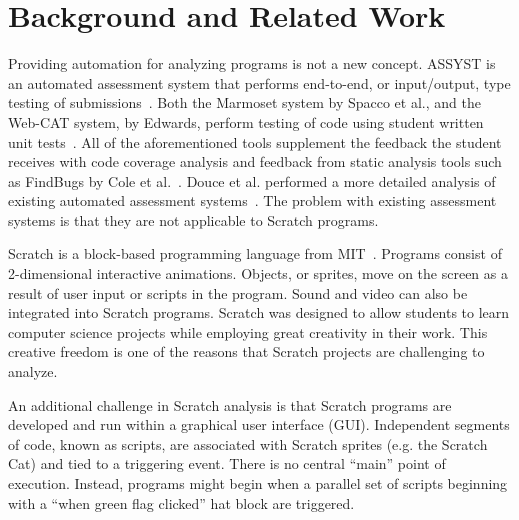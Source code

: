 \section{Background and Related Work}

Providing automation for analyzing programs is not a new concept.  ASSYST is an
automated assessment system that performs end-to-end, or input/output, type
testing of submissions~\cite{Jackson:1997:GSP:268084.268210}. Both the Marmoset
system by Spacco et al., and the Web-CAT system, by Edwards, perform testing of
code using student written unit tests~\cite{Spacco:2006:EMD:1140124.1140131,
  Edwards:2003:RCS:949344.949390}. All of the aforementioned tools supplement
the feedback the student receives with code coverage analysis and feedback from
static analysis tools such as FindBugs by Cole et
al.~\cite{Cole:2006:IYS:1176617.1176667}. Douce et al. performed a more
detailed analysis of existing automated assessment
systems~\cite{Douce:2005:ATA:1163405.1163409}.  The problem with existing
assessment systems is that they are not applicable to Scratch programs.

Scratch is a block-based programming language from
MIT~\cite{Maloney:2010:SPL:1868358.1868363}.  Programs consist of 2-dimensional
interactive animations.  Objects, or sprites, move on the screen as a result of
user input or scripts in the program.  Sound and video can also be integrated
into Scratch programs.  Scratch was designed to allow students to learn
computer science projects while employing great creativity in their work.  This
creative freedom is one of the reasons that Scratch projects are challenging to
analyze.

An additional challenge in Scratch analysis is that Scratch programs are
developed and run within a graphical user interface (GUI).  Independent
segments of code, known as scripts, are associated with Scratch sprites
(e.g. the Scratch Cat) and tied to a triggering event.  There is no central
``main'' point of execution.  Instead, programs might begin when a parallel set
of scripts beginning with a ``when green flag clicked'' hat block are
triggered.

